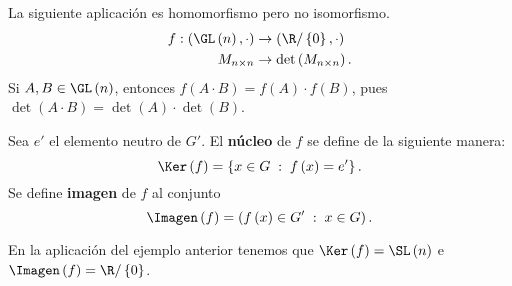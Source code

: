 \begin{eg}
\normalfont La siguiente aplicación es homomorfismo pero no isomorfismo.
\[
\begin{split}
	f : \left(\GL\left(n\right), \cdot \right) & \to \left(\R/ \left\{ 0\right\} , \cdot\right)\\
	M_{n\times n} & \to \det\left(M_{n \times n}\right).
\end{split}
\]
Si $\displaystyle A, B \in \GL\left(n\right) $, entonces $\displaystyle f\left(A \cdot B\right) = f\left(A\right) \cdot f\left(B\right) $, pues $\displaystyle \det\left(A \cdot B\right) = \det\left(A\right) \cdot \det \left(B\right) $. 
\end{eg}

\begin{fdefinition}
\normalfont Sea $\displaystyle e' $ el elemento neutro de $\displaystyle G' $. El \textbf{núcleo} de $\displaystyle f $ se define de la siguiente manera:
\[\Ker\left(f\right) = \left\{ x \in G \; : \; f\left(x\right) = e'\right\}  .\]
Se define \textbf{imagen} de $\displaystyle f $ al conjunto
\[\Imagen\left(f\right) = \left(f\left(x\right) \in G'\; : \; x \in G\right) .\]
\end{fdefinition}

\begin{eg}
	\normalfont En la aplicación del ejemplo anterior tenemos que $\displaystyle \Ker\left(f\right) = \SL\left(n\right) $ e $\displaystyle \Imagen\left(f\right)=\R/ \left\{ 0\right\}  $.
\end{eg}

